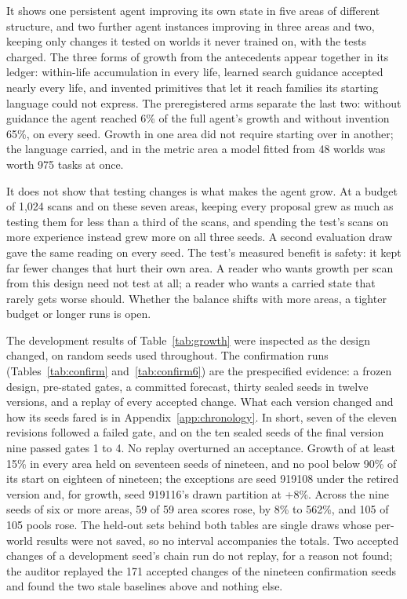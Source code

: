 \documentclass[11pt]{article}
\begin{document}
It shows one persistent agent improving its own state in five areas of different structure, and two further agent instances improving in three areas and two, keeping only changes it tested on worlds it never trained on, with the tests charged. The three forms of growth from the antecedents appear together in its ledger: within-life accumulation in every life, learned search guidance accepted nearly every life, and invented primitives that let it reach families its starting language could not express. The preregistered arms separate the last two: without guidance the agent reached 6\% of the full agent's growth and without invention 65\%, on every seed. Growth in one area did not require starting over in another; the language carried, and in the metric area a model fitted from 48 worlds was worth 975 tasks at once.

It does not show that testing changes is what makes the agent grow. At a budget of 1,024 scans and on these seven areas, keeping every proposal grew as much as testing them for less than a third of the scans, and spending the test's scans on more experience instead grew more on all three seeds. A second evaluation draw gave the same reading on every seed. The test's measured benefit is safety: it kept far fewer changes that hurt their own area. A reader who wants growth per scan from this design need not test at all; a reader who wants a carried state that rarely gets worse should. Whether the balance shifts with more areas, a tighter budget or longer runs is open.

The development results of Table~\ref{tab:growth} were inspected as the design changed, on random seeds used throughout. The confirmation runs (Tables~\ref{tab:confirm} and~\ref{tab:confirm6}) are the prespecified evidence: a frozen design, pre-stated gates, a committed forecast, thirty sealed seeds in twelve versions, and a replay of every accepted change. What each version changed and how its seeds fared is in Appendix~\ref{app:chronology}. In short, seven of the eleven revisions followed a failed gate, and on the ten sealed seeds of the final version nine passed gates 1 to 4. No replay overturned an acceptance. Growth of at least 15\% in every area held on seventeen seeds of nineteen, and no pool below 90\% of its start on eighteen of nineteen; the exceptions are seed 919108 under the retired version and, for growth, seed 919116's drawn partition at +8\%. Across the nine seeds of six or more areas, 59 of 59 area scores rose, by 8\% to 562\%, and 105 of 105 pools rose. The held-out sets behind both tables are single draws whose per-world results were not saved, so no interval accompanies the totals. Two accepted changes of a development seed's chain run do not replay, for a reason not found; the auditor replayed the 171 accepted changes of the nineteen confirmation seeds and found the two stale baselines above and nothing else.
\end{document}
